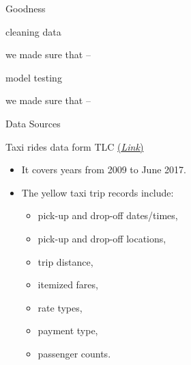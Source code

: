\documentclass[10pt,ignorenonframetext,]{beamer}
\providecommand{\tightlist}{%
  \setlength{\itemsep}{0pt}\setlength{\parskip}{0pt}}
\begin{document}
\begin{frame}{%
\protect\hypertarget{goodness}{%
Goodness}}

\begin{block}{cleaning data}

we made sure that –

\end{block}

\begin{block}{model testing}

we made sure that –

\end{block}

\end{frame}

\begin{frame}{%
\protect\hypertarget{data-sources}{%
Data Sources}}

\begin{block}{Taxi rides data form TLC
\href{http://www.nyc.gov/html/tlc/html/about/trip_record_data.shtml}{(\emph{Link})}}

\begin{itemize}
\item
  It covers years from 2009 to June 2017.
\item
  The yellow taxi trip records include:

  \begin{itemize}
  \tightlist
  \item
    pick-up and drop-off dates/times,
  \item
    pick-up and drop-off locations,
  \item
    trip distance,
  \item
    itemized fares,
  \item
    rate types,
  \item
    payment type,
  \item
    passenger counts.
  \end{itemize}
\end{itemize}

\end{block}

\end{frame}
\end{document}
